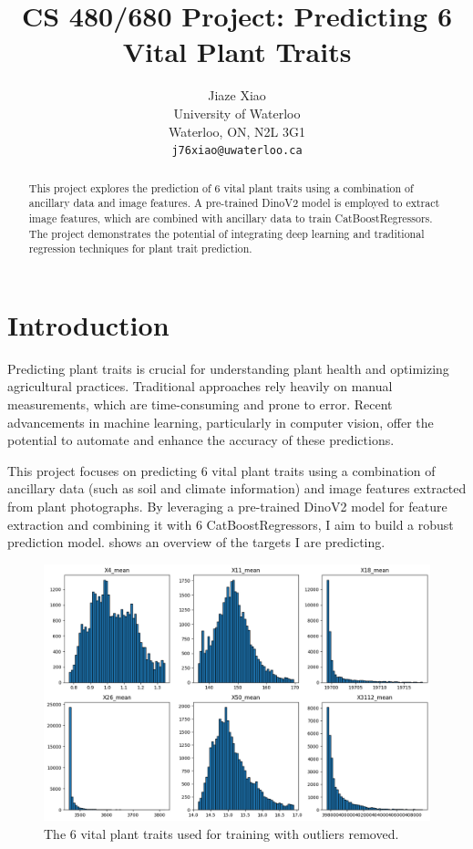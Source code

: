 \documentclass{article}
\title{CS 480/680 Project: Predicting 6 Vital Plant Traits}
\author{
	Jiaze Xiao \\
	University of Waterloo\\
	Waterloo, ON, N2L 3G1 \\
	\texttt{j76xiao@uwaterloo.ca}
}
\begin{document}
\maketitle

\begin{abstract}
	This project explores the prediction of 6 vital plant traits using a combination of ancillary data and image features. A pre-trained DinoV2 model is employed to extract image features, which are combined with ancillary data to train CatBoostRegressors. The project demonstrates the potential of integrating deep learning and traditional regression techniques for plant trait prediction.
\end{abstract}

\section{Introduction}
Predicting plant traits is crucial for understanding plant health and optimizing agricultural practices. Traditional approaches rely heavily on manual measurements, which are time-consuming and prone to error. Recent advancements in machine learning, particularly in computer vision, offer the potential to automate and enhance the accuracy of these predictions.

This project focuses on predicting 6 vital plant traits using a combination of ancillary data (such as soil and climate information) and image features extracted from plant photographs. By leveraging a pre-trained DinoV2 model for feature extraction and combining it with 6 CatBoostRegressors, I aim to build a robust prediction model.  shows an overview of the targets I are predicting.

\begin{figure}[h]
	\centering
	\includegraphics[scale=0.4]{targets.png}
	\caption{The 6 vital plant traits used for training with outliers removed.}
	\label{fig:targets}
\end{figure}
\end{document}

